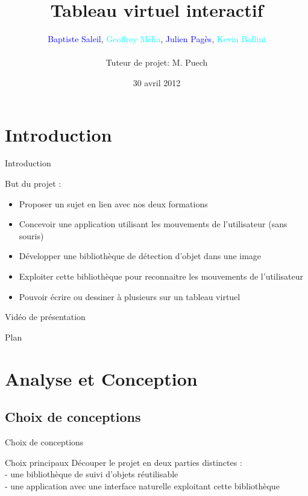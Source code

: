 \documentclass{beamer}
\title{Tableau virtuel interactif}
\author{\textcolor{blue}{Baptiste Saleil}, \textcolor{cyan}{Geoffrey Mélia}, \textcolor{blue}{Julien Pagès}, \textcolor{cyan}{Kevin Bollini} \\ \ \\Tuteur de projet: M. Puech}
\date{30 avril 2012}
\begin{document}
	\begin{frame}
		\titlepage
	\end{frame}

	\section{Introduction}
		\begin{frame}{Introduction}
		
		But du projet :
		\begin{itemize}
      \item Proposer un sujet en lien avec nos deux formations
		\item Concevoir une application utilisant les mouvements de l'utilisateur (sans souris)
		\item Développer une bibliothèque de détection d'objet dans une image
		\item Exploiter cette bibliothèque pour reconnaitre les mouvements de l'utilisateur
		\item Pouvoir écrire ou dessiner à plusieurs sur un tableau virtuel
		\end{itemize}
		
		\end{frame}

	\begin{frame}{Vidéo de présentation}
	\end{frame}

	\begin{frame}{Plan}
		\tableofcontents
	\end{frame}
		
	\section{Analyse et Conception}
	\subsection{Choix de conceptions}
		\begin{frame}{Choix de conceptions}
			\begin{block}{Choix principaux}
				Découper le projet en deux parties distinctes : \\
				- une bibliothèque de suivi d'objets réutilisable \\
				- une application avec une interface naturelle exploitant cette bibliothèque \\
			\end{block}
		\end{frame}
		
\end{document}
